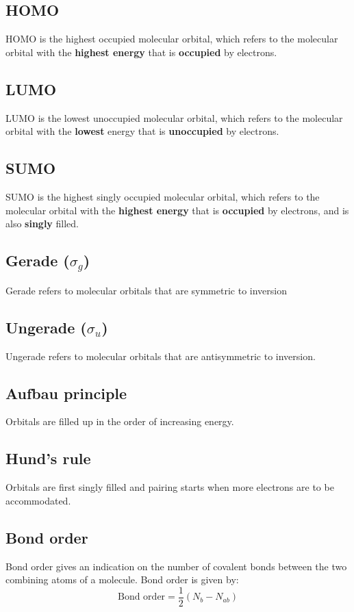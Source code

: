\documentclass[11pt]{article}
\begin{document}
\subsection{HOMO}
\label{sec:org1940191}
HOMO is the highest occupied molecular orbital, which refers to the molecular orbital with the \textbf{highest energy} that is \textbf{occupied} by electrons.

\subsection{LUMO}
\label{sec:org12a8b16}
LUMO is the lowest unoccupied molecular orbital, which refers to the molecular orbital with the \textbf{lowest} energy that is \textbf{unoccupied} by electrons.

\subsection{SUMO}
\label{sec:org2b98b4e}
SUMO is the highest singly occupied molecular orbital, which refers to the molecular orbital with the \textbf{highest energy} that is \textbf{occupied} by electrons, and is also \textbf{singly} filled.

\subsection{Gerade (\(\sigma_g\))}
\label{sec:org328672c}
Gerade refers to molecular orbitals that are symmetric to inversion

\subsection{Ungerade (\(\sigma_u\))}
\label{sec:orgfe709bf}
Ungerade refers to molecular orbitals that are antisymmetric to inversion.

\subsection{Aufbau principle}
\label{sec:orgeef9e58}
Orbitals are filled up in the order of increasing energy.

\subsection{Hund's rule}
\label{sec:orgf004ea5}
Orbitals are first singly filled and pairing starts when more electrons are to be accommodated.

\subsection{Bond order}
\label{sec:org70734fd}
Bond order gives an indication on the number of covalent bonds between the two combining atoms of a molecule. Bond order is given by:
\[\text{Bond order} = \frac{1}{2}(N_b - N_{ab})\]
\end{document}
